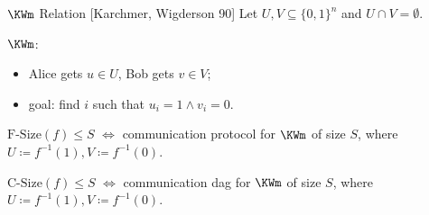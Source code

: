 

\begin{frame}{$\KWm$ Relation [Karchmer, Wigderson 90]}
    Let $U, V \subseteq \{0, 1\}^{n}$ and $U \cap V = \emptyset$.

    \vspace{0.1cm}
    $\KWm$:
    \begin{itemize}
        \item Alice gets $u \in U$, Bob gets $v \in V$;
        \item goal: find $i$ such that $u_i = 1 \land v_i = 0$.
    \end{itemize}

    \pause

    \begin{theorem}
        $\mathrm{F\text{-}Size}(f) \le S$ $\Leftrightarrow$ communication protocol
        for $\KWm$ of size $S$, where $U \coloneqq f^{-1}(1), V \coloneqq f^{-1}(0)$.
    \end{theorem}

    \pause
    \begin{theorem}
        $\mathrm{C\text{-}Size}(f) \le S$ $\Leftrightarrow$ communication \alert{dag}
        for $\KWm$ of size $S$, where $U \coloneqq f^{-1}(1), V \coloneqq f^{-1}(0)$.
    \end{theorem}
\end{frame}



